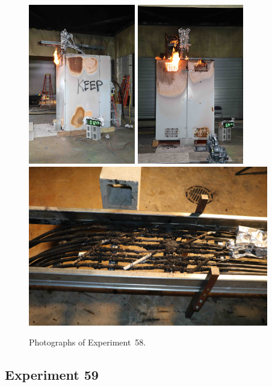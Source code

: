 \documentclass[12pt]{article}
\begin{document}
\begin{figure}[p]
\centering
\includegraphics[height=2.75in,angle=-90]{../FIGURES/Test_58_12_min_29_s}
\includegraphics[height=2.75in,angle=-90]{../FIGURES/Test_58_34_min_44_s} \\
\includegraphics[height=2.75in]{../FIGURES/Test_58_scar}
\caption[Photographs of Experiment~58]{Photographs of Experiment~58.}
\label{fig:Test_58_photos}
\end{figure}


\clearpage

\subsection{Experiment 59}
\end{document}
